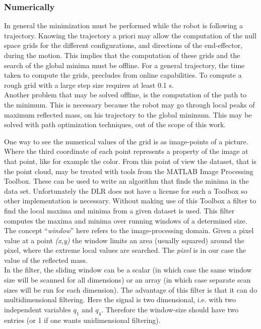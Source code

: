 \subsubsection{Numerically}
\label{sec:global_numerical}


In general the minimization must be performed while the robot is following a trajectory. Knowing the trajectory a priori may allow the computation of the null space grids for the different configurations, and directions of the end-effector, during the motion. This implies that the computation of these grids and the search of the global minima must be offline. For a general trajectory, the time taken to compute the grids, precludes from online capabilities. To compute a rough grid with a large step size requires at least 0.1 s.\\
%
Another problem that may be solved offline, is the computation of the path to the minimum. This is necessary because the robot may go through local peaks of maximum reflected mass, on his trajectory to the global minimum. This may be solved with path optimization techniques, out of the scope of this work. 

%
One way to see the numerical values of the grid is as image-points of a picture. Where the third coordinate of each point represents a property of the image at that point, like for example the color. From this point of view the dataset, that is the point cloud, may be treated with tools from the MATLAB Image Processing Toolbox. These can be used to write an algorithm that finds the minima in the data set. Unfortunately the DLR does not have a license for such a Toolbox so other implementation is necessary.
Without making use of this Toolbox a filter \cite{minmaxfilter} to find the local maxima and minima from a given dataset is used. This filter computes the maxima and minima over running windows of a determined size. The concept “\textit{window}” here refers to the image-processing domain. Given a pixel value at a point \textit{(x,y)} the window limits an area (usually squared) around the pixel, where the extreme local values are searched. The \textit{pixel} is in our case  the value of the reflected mass.\\
%
In the filter, the sliding window can be a scalar (in which case the same window size will be scanned for all dimensions) or an array (in which case separate scan sizes will be run for each dimension). The advantage of this filter is that it can do multidimensional filtering. Here the signal is two dimensional, i.e. with two independent variables $q_1$ and $q_4$. Therefore the window-size should have two entries (or 1 if one wants unidimensional filtering).


